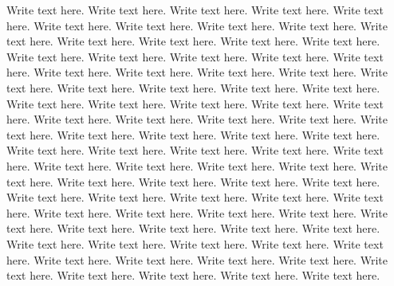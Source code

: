 \documentclass{llncs}
\begin{document}
Write text here.  Write text here.  Write text here.  Write text here.
Write text here.  Write text here.  Write text here.  Write text here.
Write text here.  Write text here.  Write text here.  Write text here.
Write text here.  Write text here.  Write text here.  Write text here.
Write text here.  Write text here.  Write text here.  Write text here.
Write text here.  Write text here.  Write text here.  Write text here.
Write text here.  Write text here.  Write text here.  Write text here.
Write text here.  Write text here.  Write text here.  Write text here.
Write text here.  Write text here.  Write text here.  Write text here.
Write text here.  Write text here.  Write text here.  Write text here.
Write text here.  Write text here.  Write text here.  Write text here.
Write text here.  Write text here.  Write text here.  Write text here.
Write text here.  Write text here.  Write text here.  Write text here.
Write text here.  Write text here.  Write text here.  Write text here.
Write text here.  Write text here.  Write text here.  Write text here.
Write text here.  Write text here.  Write text here.  Write text here.
Write text here.  Write text here.  Write text here.  Write text here.
Write text here.  Write text here.  Write text here.  Write text here.
Write text here.  Write text here.  Write text here.  Write text here.
Write text here.  Write text here.  Write text here.  Write text here.
Write text here.  Write text here.  Write text here.  Write text here.






\end{document}

